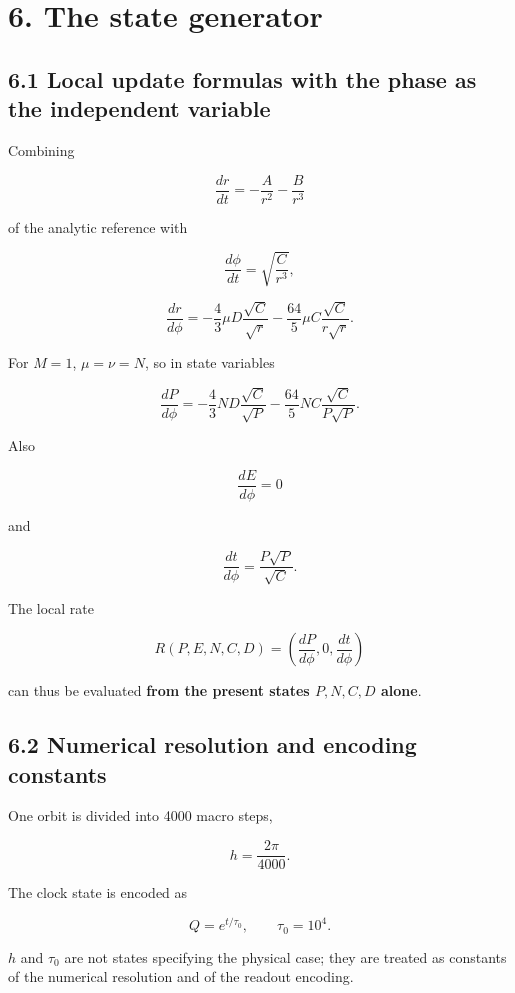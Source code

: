 \documentclass[
  a4paper,
]{article}
\begin{document}
\section{6. The state generator}\label{the-state-generator}

\subsection{6.1 Local update formulas with the phase as the independent
variable}\label{local-update-formulas-with-the-phase-as-the-independent-variable}

Combining

\[
\frac{dr}{dt}
=-\frac{A}{r^2}-\frac{B}{r^3}
\]

of the analytic reference with

\[
\frac{d\phi}{dt}=\sqrt{\frac{C}{r^3}},
\]

\[
\frac{dr}{d\phi}
=
-\frac{4}{3}\mu D\frac{\sqrt C}{\sqrt r}
-\frac{64}{5}\mu C\frac{\sqrt C}{r\sqrt r}.
\]

For \(M=1\), \(\mu=\nu=N\), so in state variables

\[
\boxed{
\frac{dP}{d\phi}
=
-\frac{4}{3}ND\frac{\sqrt C}{\sqrt P}
-\frac{64}{5}NC\frac{\sqrt C}{P\sqrt P}.
}
\]

Also

\[
\boxed{
\frac{dE}{d\phi}=0
}
\]

and

\[
\boxed{
\frac{dt}{d\phi}
=
\frac{P\sqrt P}{\sqrt C}.
}
\]

The local rate

\[
R(P,E,N,C,D)
=
\left(
\frac{dP}{d\phi},
0,
\frac{dt}{d\phi}
\right)
\]

can thus be evaluated \textbf{from the present states \(P,N,C,D\)
alone}.

\subsection{6.2 Numerical resolution and encoding
constants}\label{numerical-resolution-and-encoding-constants}

One orbit is divided into 4000 macro steps,

\[
h=\frac{2\pi}{4000}.
\]

The clock state is encoded as

\[
Q=e^{t/\tau_0},
\qquad
\tau_0=10^4.
\]

\(h\) and \(\tau_0\) are not states specifying the physical case; they
are treated as constants of the numerical resolution and of the readout
encoding.
\end{document}
